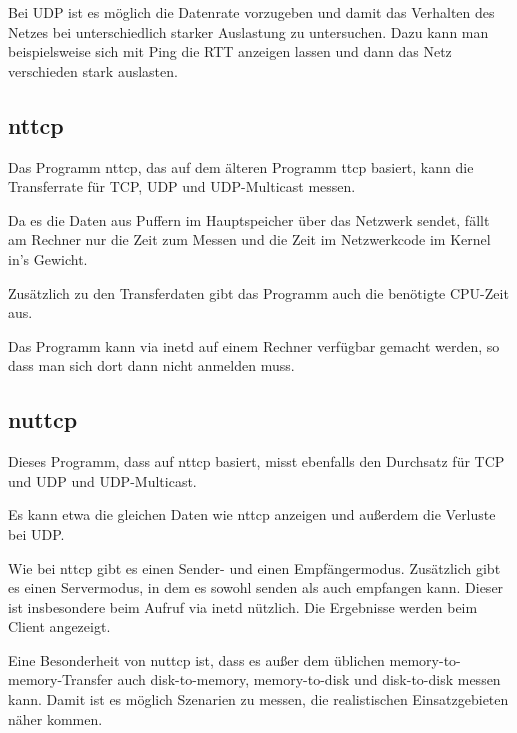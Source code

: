 \begin{normaltext}
  Bei UDP ist es möglich die Datenrate vorzugeben und damit das Verhalten des
  Netzes bei unterschiedlich starker Auslastung zu untersuchen. Dazu kann man
  beispielsweise sich mit Ping die RTT anzeigen lassen und dann das Netz
  verschieden stark auslasten.

  \subsection*{nttcp}
  Das Programm nttcp, das auf dem älteren Programm ttcp basiert, kann die
  Transferrate für TCP, UDP und UDP-Multicast messen.

  Da es die Daten aus Puffern im Hauptspeicher über das Netzwerk sendet, fällt
  am Rechner nur die Zeit zum Messen und die Zeit im Netzwerkcode im Kernel
  in's Gewicht.

  Zusätzlich zu den Transferdaten gibt das Programm auch die benötigte
  CPU-Zeit aus.

  Das Programm kann via inetd auf einem Rechner verfügbar gemacht werden, so
  dass man sich dort dann nicht anmelden muss.

  \subsection*{nuttcp}
  Dieses Programm, dass auf nttcp basiert, misst ebenfalls den Durchsatz für
  TCP und UDP und UDP-Multicast.

  Es kann etwa die gleichen Daten wie nttcp anzeigen und außerdem die Verluste
  bei UDP.

  Wie bei nttcp gibt es einen Sender- und einen Empfängermodus. Zusätzlich
  gibt es einen Servermodus, in dem es sowohl senden als auch empfangen kann.
  Dieser ist insbesondere beim Aufruf via inetd nützlich. Die Ergebnisse
  werden beim Client angezeigt.

  Eine Besonderheit von nuttcp ist, dass es außer dem üblichen
  memory-to-memory-Transfer auch disk-to-memory, memory-to-disk und
  disk-to-disk messen kann. Damit ist es möglich Szenarien zu messen, die
  realistischen Einsatzgebieten näher kommen.
\end{normaltext}

